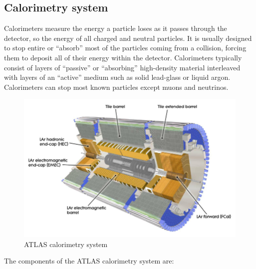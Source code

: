 \documentclass[a4paper, oneside]{book}
\begin{document}
				\subsection{Calorimetry system}
					\cite{Calo intro}Calorimeters measure the energy a particle loses as it passes through the detector, so the energy of all charged and neutral particles. It is usually designed to stop entire or “absorb” most of the particles coming from a collision, forcing them to deposit all of their energy within the detector. Calorimeters typically consist of layers of “passive” or “absorbing” high-density material interleaved with layers of an “active” medium such as solid lead-glass or liquid argon. Calorimeters can stop most known particles except muons and neutrinos.
					\begin{figure} [H]
						\centering
						\includegraphics[width=.45\textwidth]{tesi_images/calorimeters.png} 
						\caption{ATLAS calorimetry system}
						\label{fig:Calorimetry}
					\end{figure}
					The components of the ATLAS calorimetry system are: \cite{Calorimetry}
\end{document}
